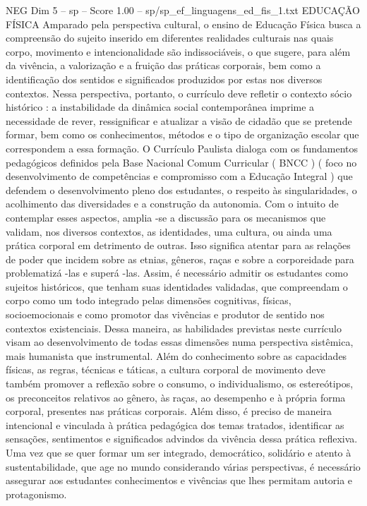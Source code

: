 \begin{textsample}{NEG Dim 5 – sp – Score 1.00 – sp/sp\_ef\_linguagens\_ed\_fis\_1.txt}  \label{ex:f5_neg_216}
EDUCAÇÃO FÍSICA Amparado pela perspectiva cultural, o ensino de Educação Física busca a compreensão do sujeito inserido em diferentes realidades culturais nas quais corpo, movimento e intencionalidade são indissociáveis, o que sugere, para além da vivência, a valorização e a fruição das práticas corporais, bem como a identificação dos sentidos e significados produzidos por estas nos diversos contextos.
Nessa perspectiva, portanto, o currículo deve refletir o contexto sócio histórico : a instabilidade da dinâmica social contemporânea imprime a necessidade de rever, ressignificar e atualizar a visão de cidadão que se pretende formar, bem como os conhecimentos, métodos e o tipo de organização escolar que correspondem a essa formação.
O Currículo Paulista dialoga com os fundamentos pedagógicos definidos pela Base Nacional Comum Curricular ( BNCC ) ( foco no desenvolvimento de competências e compromisso com a Educação Integral ) que defendem o desenvolvimento pleno dos estudantes, o respeito às singularidades, o acolhimento das diversidades e a construção da autonomia.
Com o intuito de contemplar esses aspectos, amplia -se a discussão para os mecanismos que validam, nos diversos contextos, as identidades, uma cultura, ou ainda uma prática corporal em detrimento de outras.
Isso significa atentar para as relações de poder que incidem sobre as etnias, gêneros, raças e sobre a corporeidade para problematizá -las e superá -las.
Assim, é necessário admitir os estudantes como sujeitos históricos, que tenham suas identidades validadas, que compreendam o corpo como um todo integrado pelas dimensões cognitivas, físicas, socioemocionais e como promotor das vivências e produtor de sentido nos contextos existenciais.
Dessa maneira, as habilidades previstas neste currículo visam ao desenvolvimento de todas essas dimensões numa perspectiva sistêmica, mais humanista que instrumental.
Além do conhecimento sobre as capacidades físicas, as regras, técnicas e táticas, a cultura corporal de movimento deve também promover a reflexão sobre o consumo, o individualismo, os estereótipos, os preconceitos relativos ao gênero, às raças, ao desempenho e à própria forma corporal, presentes nas práticas corporais.
Além disso, é preciso de maneira intencional e vinculada à prática pedagógica dos temas tratados, identificar as sensações, sentimentos e significados advindos da vivência dessa prática reflexiva.
Uma vez que se quer formar um ser integrado, democrático, solidário e atento à sustentabilidade, que age no mundo considerando várias perspectivas, é necessário assegurar aos estudantes conhecimentos e vivências que lhes permitam autoria e protagonismo.

\end{textsample}
